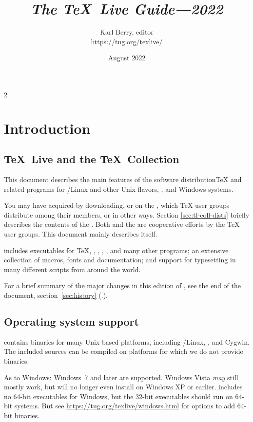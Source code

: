 \documentclass{article}
\title{%
  {\huge \textit{The \TeX\ Live Guide---2022}}
}
\author{Karl Berry, editor \\[3mm]
        \url{https://tug.org/texlive/}
       }
\date{August 2022}
\begin{document}
\maketitle

\begin{multicols}{2}
\tableofcontents
\end{multicols}

\section{Introduction}
\label{sec:intro}

\subsection{\protect\TeX\protect\ Live and the \protect\TeX\protect\ Collection}

This document describes the main features of the \TL{} software
distribution\Dash \TeX{} and related programs for \GNU/Linux
and other Unix flavors, \MacOSX, and Windows systems.

You may have acquired \TL{} by downloading, or on the \TK{} \DVD, which
\TeX{} user groups distribute among their members, or in other ways.
Section \ref{sec:tl-coll-dists} briefly describes the contents of the
\DVD.  Both \TL{} and the \TK{} are cooperative efforts by the \TeX{}
user groups. This document mainly describes \TL{} itself.

\TL{} includes executables for \TeX{}, \LaTeXe{}, \ConTeXt,
\MF, \MP, \BibTeX{} and many other programs; an extensive collection
of macros, fonts and documentation; and support for typesetting in
many different scripts from around the world.

For a brief summary of the major changes in this edition of \TL{},
see the end of the document, section~\ref{sec:history}
(\p.\pageref{sec:history}).


\subsection{Operating system support}
\label{sec:os-support}

\TL{} contains binaries for many Unix-based platforms, including
\GNU/Linux, \MacOSX, and Cygwin.  The included sources can be compiled
on platforms for which we do not provide binaries.

As to Windows: Windows~7 and later are supported. Windows Vista
\emph{may} still mostly work, but \TL{} will no longer even install on Windows
XP or earlier.  \TL{} includes no
64-bit executables for Windows, but the 32-bit executables should
run on 64-bit systems. But see
\url{https://tug.org/texlive/windows.html} for options to add
64-bit binaries.
\end{document}
